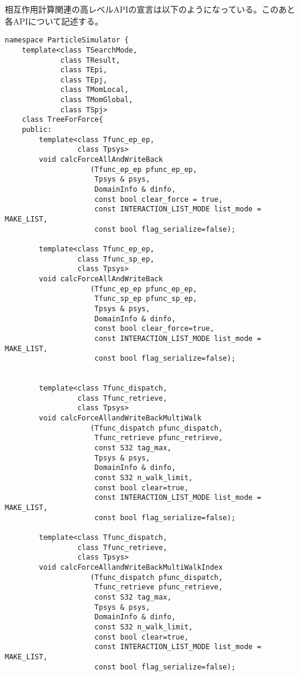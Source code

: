 相互作用計算関連の高レベルAPIの宣言は以下のようになっている。このあと
各APIについて記述する。
\begin{lstlisting}[caption=TreeForForce1]
namespace ParticleSimulator {
    template<class TSearchMode,
             class TResult,
             class TEpi,
             class TEpj,
             class TMomLocal,
             class TMomGlobal,
             class TSpj>
    class TreeForForce{
    public:
        template<class Tfunc_ep_ep,
                 class Tpsys>
        void calcForceAllAndWriteBack
                    (Tfunc_ep_ep pfunc_ep_ep,
                     Tpsys & psys,
                     DomainInfo & dinfo,
                     const bool clear_force = true,
                     const INTERACTION_LIST_MODE list_mode = MAKE_LIST,
                     const bool flag_serialize=false);
                     
        template<class Tfunc_ep_ep,
                 class Tfunc_sp_ep,
                 class Tpsys>
        void calcForceAllAndWriteBack
                    (Tfunc_ep_ep pfunc_ep_ep,
                     Tfunc_sp_ep pfunc_sp_ep,  
                     Tpsys & psys,
                     DomainInfo & dinfo,
                     const bool clear_force=true,
                     const INTERACTION_LIST_MODE list_mode = MAKE_LIST,
                     const bool flag_serialize=false);

                     
        template<class Tfunc_dispatch,
                 class Tfunc_retrieve,
                 class Tpsys>
        void calcForceAllandWriteBackMultiWalk
                    (Tfunc_dispatch pfunc_dispatch,
                     Tfunc_retrieve pfunc_retrieve,
                     const S32 tag_max,
                     Tpsys & psys,
                     DomainInfo & dinfo,
                     const S32 n_walk_limit,
                     const bool clear=true,
                     const INTERACTION_LIST_MODE list_mode = MAKE_LIST,
                     const bool flag_serialize=false); 

        template<class Tfunc_dispatch,
                 class Tfunc_retrieve,
                 class Tpsys>
        void calcForceAllandWriteBackMultiWalkIndex
                    (Tfunc_dispatch pfunc_dispatch,
                     Tfunc_retrieve pfunc_retrieve,
                     const S32 tag_max,
                     Tpsys & psys,
                     DomainInfo & dinfo,
                     const S32 n_walk_limit,
                     const bool clear=true,
                     const INTERACTION_LIST_MODE list_mode = MAKE_LIST,
                     const bool flag_serialize=false);


\end{lstlisting}
